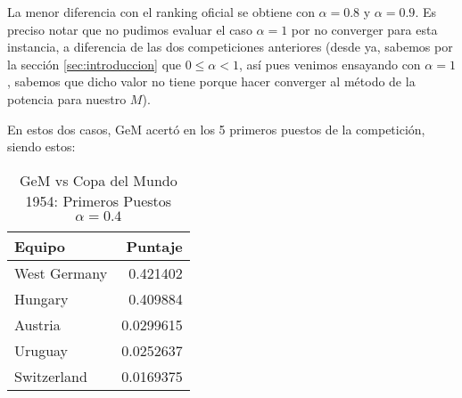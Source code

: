 \begin{enumerate}
        \par La menor diferencia con el ranking oficial se obtiene con
        $\alpha=0.8$ y $\alpha=0.9$. Es preciso notar que no pudimos evaluar el
        caso $\alpha=1$ por no converger para esta instancia, a diferencia de
        las dos competiciones anteriores (desde ya, sabemos por la secci\'on
        \ref{sec:introduccion} que $0\leq\alpha <1$, as\'i pues venimos
        ensayando con $\alpha=1$, sabemos que dicho valor no tiene porque hacer
        converger al m\'etodo de la potencia para nuestro $M$).

        \par En estos dos casos, GeM acertó en los 5 primeros puestos de la
        competición, siendo estos:
        \begin{table}[H]
            \centering
            \caption{GeM vs Copa del Mundo 1954: Primeros Puestos $\alpha=0.4$}
            \setlength{\tabcolsep}{3pt}
            \begin{tabular}{|l|r|}
                \hline\hline
                Equipo & Puntaje\\
                \hline
                West Germany &0.421402\\
                Hungary &0.409884\\
                Austria &0.0299615\\
                Uruguay &0.0252637\\
                Switzerland &0.0169375\\
                \hline\hline
            \end{tabular}
        \end{table}
\end{enumerate}
